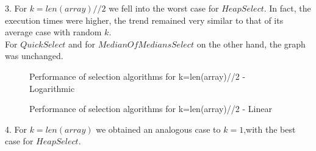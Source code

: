 \documentclass{article}
\begin{document}
3. For $k=len(array)//2$ we fell into the worst case for $HeapSelect$. In fact, the execution times were higher, the trend remained very similar to that of its average case with random $k$.\\
For $QuickSelect$ and for $MedianOfMediansSelect$ on the other hand, the graph was unchanged.\\

\begin{figure}[H]   
  \caption{Performance of selection algorithms for k=len(array)//2 -Logarithmic}
\end{figure}

\begin{figure}[H]   
  \caption{Performance of selection algorithms for k=len(array)//2 - Linear}
\end{figure}

4. For $k=len(array)$ we obtained an analogous case to $k=1$,with the best case for $HeapSelect$.\\
\end{document}
